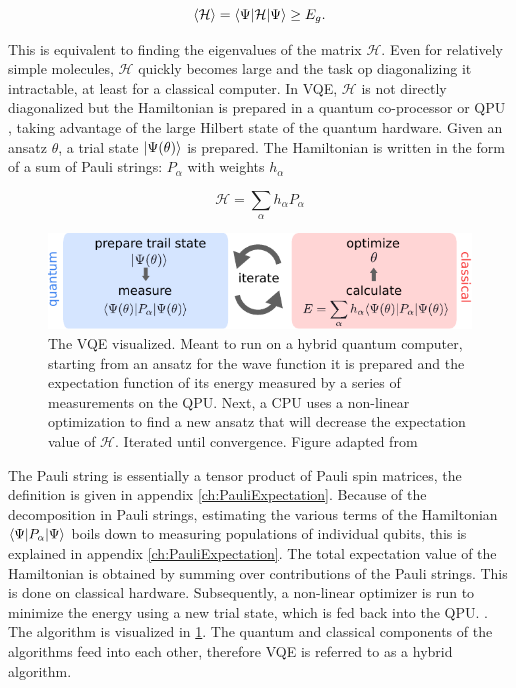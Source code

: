 \begin{equation}\label{eq:VariationalPrinciple}
	\left\langle \mathcal{H} \right\rangle = \langle\Psi\rvert\mathcal{H} \lvert\Psi\rangle \geq E_g.
\end{equation}

This is equivalent to finding the eigenvalues of the matrix $\mathcal{H}$. Even for relatively simple molecules, $\mathcal{H}$ quickly becomes large and the task op diagonalizing it intractable, at least for a classical computer. In \ac{VQE}, $\mathcal{H}$ is not directly diagonalized but the Hamiltonian is prepared in a quantum co-processor or \ac{QPU} \cite{Henriet2020,Peruzzo2014}, taking advantage of the large Hilbert state of the quantum hardware. Given an ansatz $\theta$, a trial state $\lvert\Psi(\theta)\rangle$ is prepared. The Hamiltonian is written in the form of a sum of Pauli strings: $P_{\alpha}$ with weights $h_{\alpha}$ \cite{McClean2016,Moll2018}

\begin{equation}\label{eq:PauliDecomposition}
	\mathcal{H} = \sum_{\alpha} h_{\alpha} P_{\alpha}
\end{equation}

\begin{figure}
	\centering
	\includegraphics[width=0.75\linewidth]{figures/VQE.pdf}
	\caption{The \ac{VQE} visualized. Meant to run on a hybrid quantum computer, starting from an ansatz for the wave function it is prepared and the expectation function of its energy measured by a series of measurements on the \ac{QPU}. Next, a CPU uses a non-linear optimization to find a new ansatz that will decrease the expectation value of $\mathcal{H}$. Iterated until convergence. Figure adapted from \cite{Moll2018}}
	\label{fig:VQE}
\end{figure}

The Pauli string is essentially a tensor product of Pauli spin matrices, the definition is given in appendix \ref{ch:PauliExpectation}. Because of the decomposition in Pauli strings, estimating the various terms of the Hamiltonian $\langle\Psi\rvert P_{\alpha} \lvert\Psi\rangle$ boils down to measuring populations of individual qubits, this is explained in appendix \ref{ch:PauliExpectation}. The total expectation value of the Hamiltonian is obtained by summing over contributions of the Pauli strings. This is done on classical hardware. Subsequently, a non-linear optimizer is run to minimize the energy using a new trial state, which is fed back into the \ac{QPU}. \cite{Moll2018}. The algorithm is visualized in \cref{fig:VQE}. The quantum and classical components of the algorithms feed into each other, therefore \ac{VQE} is referred to as a hybrid algorithm. 

